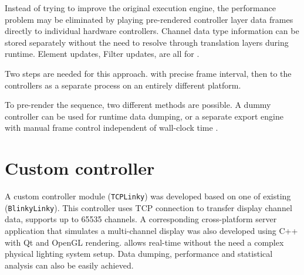 Instead of trying to improve the original execution engine, the performance problem may be eliminated by playing pre-rendered controller layer data frames directly to individual hardware controllers. Channel data type information can be stored separately without the need to resolve through translation layers during runtime. Element updates, Filter updates,  are all  for .

Two steps are needed for this approach.  with precise frame interval, then  to the controllers as a separate process on an entirely different platform.

To pre-render the sequence, two different methods are possible. A dummy controller can be used for runtime data dumping, or a separate export engine with manual frame control independent of wall-clock time . 

\section{Custom controller}
\label{sec:tcplinky}

A custom controller module (\texttt{TCPLinky}) was developed based on one of  existing  (\texttt{BlinkyLinky}). This controller uses TCP connection to transfer display channel data,  supports up to 65535 channels. A corresponding cross-platform server application that simulates a multi-channel display was also developed using C++ with Qt \cite{qt} and OpenGL \cite{shreiner2009opengl} rendering.  allows real-time  without the need  a complex physical lighting system setup. Data dumping, performance and statistical analysis can also be easily achieved.

